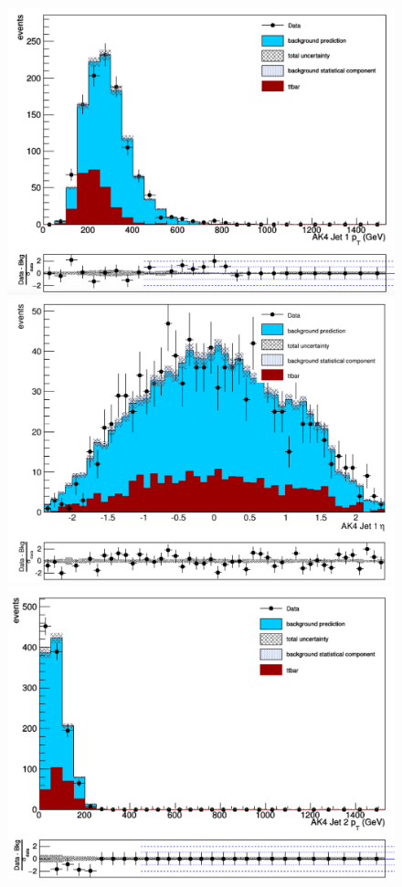 \begin{figure}[thb!]
\begin{center}
\includegraphics[scale=0.25]{Figures/AK41ptCR2.pdf}
\includegraphics[scale=0.25]{Figures/AK41etaCR2.pdf}\\
\includegraphics[scale=0.25]{Figures/AK42ptCR2.pdf}

\end{center}
\end{figure}
